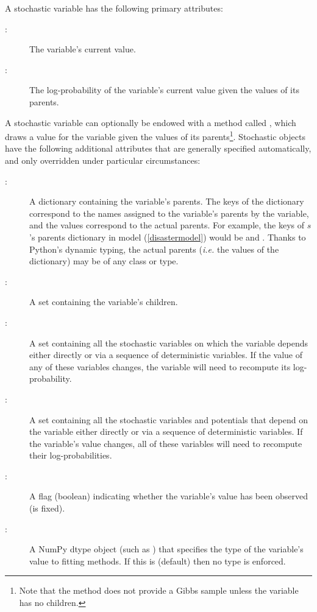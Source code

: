 A stochastic variable has the following primary attributes: 
\begin{description}
    \item[:] The variable's current value.
    \item[:] The log-probability of the variable's current value given the values of its parents.
\end{description}
A stochastic variable can optionally be endowed with a method called , which draws a value for the variable given the values of its parents\footnote{Note that the  method does not provide a Gibbs sample unless the variable has no children.}. Stochastic objects have the following additional attributes that are generally specified automatically, and only overridden under particular circumstances:
\begin{description}
    \item[:] A dictionary containing the variable's parents. The keys of the dictionary correspond to the names assigned to the variable's parents by the variable, and the values correspond to the actual parents. For example, the keys of $s$'s parents dictionary in model (\ref{disastermodel}) would be  and . Thanks to Python's dynamic typing, the actual parents (\emph{i.e.} the values of the dictionary) may be of any class or type.
    \item[:] A set containing the variable's children.
    \item[:] A set containing all the stochastic variables on which the variable depends either directly or via a sequence of deterministic variables. If the value of any of these variables changes, the variable will need to recompute its log-probability.
    \item[:] A set containing all the stochastic variables and potentials that depend on the variable either directly or via a sequence of deterministic variables. If the variable's value changes, all of these variables will need to recompute their log-probabilities.
    \item[:] A flag (boolean) indicating whether the variable's value has been observed (is fixed).
    \item[:] A NumPy dtype object (such as ) that specifies the type of the variable's value to fitting methods. If this is  (default) then no type is enforced.
\end{description}

